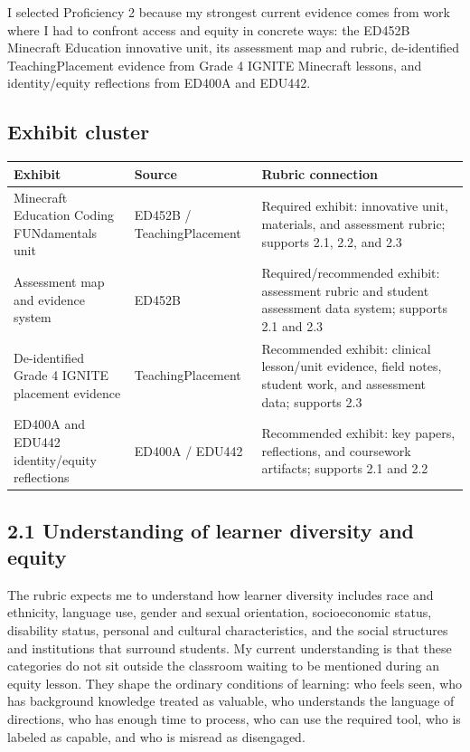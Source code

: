 \documentclass[12pt]{article}
\begin{document}
I selected Proficiency 2 because my strongest current evidence comes from work where I had to confront access and equity in concrete ways: the ED452B Minecraft Education innovative unit, its assessment map and rubric, de-identified TeachingPlacement evidence from Grade 4 IGNITE Minecraft lessons, and identity/equity reflections from ED400A and EDU442.

\subsection{Exhibit cluster}

\begin{longtable}{p{}p{}p{}}
\textbf{Exhibit} & \textbf{Source} & \textbf{Rubric connection}\\ \hline
Minecraft Education Coding FUNdamentals unit & ED452B / TeachingPlacement & Required exhibit: innovative unit, materials, and assessment rubric; supports 2.1, 2.2, and 2.3\\
Assessment map and evidence system & ED452B & Required/recommended exhibit: assessment rubric and student assessment data system; supports 2.1 and 2.3\\
De-identified Grade 4 IGNITE placement evidence & TeachingPlacement & Recommended exhibit: clinical lesson/unit evidence, field notes, student work, and assessment data; supports 2.3\\
ED400A and EDU442 identity/equity reflections & ED400A / EDU442 & Recommended exhibit: key papers, reflections, and coursework artifacts; supports 2.1 and 2.2\\
\end{longtable}

\subsection{2.1 Understanding of learner diversity and equity}

The rubric expects me to understand how learner diversity includes race and ethnicity, language use, gender and sexual orientation, socioeconomic status, disability status, personal and cultural characteristics, and the social structures and institutions that surround students. My current understanding is that these categories do not sit outside the classroom waiting to be mentioned during an equity lesson. They shape the ordinary conditions of learning: who feels seen, who has background knowledge treated as valuable, who understands the language of directions, who has enough time to process, who can use the required tool, who is labeled as capable, and who is misread as disengaged.
\end{document}
